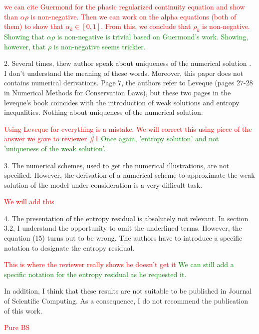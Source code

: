\documentclass{article}
\newcommand{\tcr}[1]{\textcolor{red}{#1}}
\newcommand{\tcg}[1]{\textcolor{green}{#1}}
\begin{document}
\tcr{we can cite Guermond for the phasic regularized continuity equation and show
than $\alpha \rho$ is non-negative. Then we can work on the alpha equations (both of them) to show
that  $\alpha_k \in [0, 1]$. From this, we conclude that $\rho_k$ is non-negative.} \tcg{Showing that $\alpha \rho$ is
non-negative is trivial based on Guermond's work. Showing, however, that $\rho$ is non-negative seems trickier.}
\bigskip


{\color{blue}
2. Several times, thew author speak about uniqueness of the numerical solution
. I don’t understand the meaning of these words. Moreover, this
paper does not contains numerical derivations. Page 7, the authors refer
to Leveque (pages 27-28 in Numerical Methods for Conservation Laws),
but these two pages in the leveque’s book coincides with the introduction
of weak solutions and entropy inequalities. Nothing about uniqueness of
the numerical solution.}

\tcr{Using Leveque for everything is a mistake. We will correct this using
piece of the answer we gave to reviewer \#1} \tcg{Once again, 'entropy solution' and
not 'uniqueness of the weak solution'.}
\bigskip


{\color{blue}
3. The numerical schemes, used to get the numerical illustrations, are not
specified. However, the derivation of a numerical scheme to approximate
the weak solution of the model under consideration is a very difficult task.}

\tcr{We will add this}
\bigskip


{\color{blue}
4. The presentation of the entropy residual is absolutely not relevant. In
section 3.2, I understand the opportunity to omit the underlined terms.
However, the equation (15) turns out to be wrong. The authors have to
introduce a specific notation to designate the entropy residual.}

\tcr{This is where the reviewer really shows he doesn't get it} \tcg{We can still add 
a specific notation for the entropy residual as he requested it.}
\bigskip


{\color{blue}
In addition, I think that these results are not suitable to be published in Journal
of Scientific Computing. As a consequence, I do not recommend the publication
of this work.}

\tcr{Pure BS}
\bigskip
\end{document}

